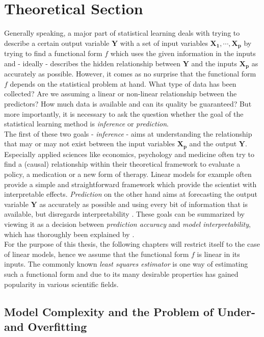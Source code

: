 \documentclass[12pt,a4paper]{article}
\begin{document}
\section{Theoretical Section}\label{sec:theorysuper}
Generally speaking, a major part of statistical learning deals with trying to describe a certain output variable $\mathbf{Y}$ with a set of input variables $\mathbf{X_1}, \cdots, \mathbf{X_p}$ by trying to find a functional form $f$ which uses the given information in the inputs and - ideally - describes the hidden relationship between $\mathbf{Y}$ and the inputs $\mathbf{X_p}$ as accurately as possible. However, it comes as no surprise that the functional form $f$ depends on the statistical problem at hand. What type of data has been collected? Are we assuming a linear or non-linear relationship between the predictors? How much data is available and can its quality be guaranteed? But more importantly, it is necessary to ask the question whether the goal of the statistical learning method is \textit{inference} or \textit{prediction}.\\

The first of these two goals - \textit{inference} - aims at understanding the relationship that may or may not exist between the input variables $\mathbf{X_p}$ and the output $\mathbf{Y}$. Especially applied sciences like economics, psychology and medicine often try to find a (causal) relationship within their theoretical framework to evaluate a policy, a medication or a new form of therapy. Linear models for example often provide a simple and straightforward framework which provide the scientist with interpretable effects. \textit{Prediction} on the other hand aims at forecasting the output variable $\mathbf{Y}$ as accurately as possible and using every bit of information that is available, but disregards interpretability \parencite[21]{ESL2009}. These goals can be summarized by viewing it as a decision between \textit{prediction accuracy} and \textit{model interpretability}, which has thoroughly been explained by \textcite{ESL2009}.\\

For the purpose of this thesis, the following chapters will restrict itself to the case of linear models, hence we assume that the functional form $f$ is linear in its inputs. The commonly known \textit{least squares estimator} is one way of estimating such a functional form and due to its many desirable properties has gained popularity in various  scientific fields. 

\subsection{Model Complexity and the Problem of Under- and Overfitting}
\end{document}
